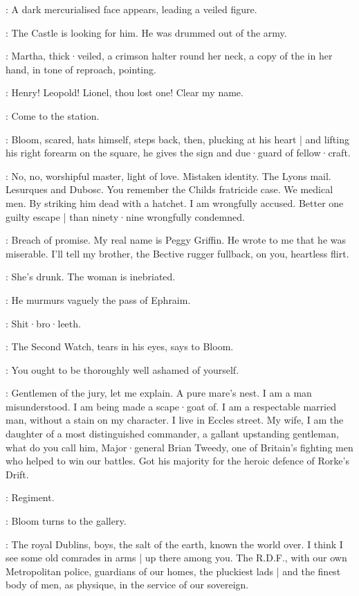 :
A dark mercurialised face appears,
leading a veiled figure.

\DarkMercury:
The Castle is looking for him.
He was drummed out of the army.

:
Martha,
thick·veiled,
a crimson halter round her neck,
a copy of the 
in her hand,
in tone of reproach,
pointing.

\Martha:
Henry!
Leopold!
Lionel,
thou lost one!
Clear my name.

\FirstWatch[1]:
Come to the station.

:
Bloom,
scared,
hats himself,
steps back,
then,
plucking at his heart |
and lifting his right forearm on the square,
he gives the sign and due·guard of fellow·craft.

\Bloom:
No,
no,
worshipful master,
light of love.
Mistaken identity.
The Lyons mail.
Lesurques and Dubosc.
You remember the Childs fratricide case.
We medical men.
By striking him dead with a hatchet.
I am wrongfully accused.
Better one guilty escape |
than ninety·nine wrongfully condemned.

\Martha:
Breach of promise.
My real name is Peggy Griffin.
He wrote to me that he was miserable.
I'll tell my brother,
the Bective rugger fullback,
on you,
heartless flirt.

\Bloom:
She's drunk.
The woman is inebriated.

:
He murmurs vaguely the pass of Ephraim.

\Bloom:
Shit·bro·leeth.

:
The Second Watch,
tears in his eyes,
says to Bloom.

\SecondWatch:
You ought to be thoroughly well ashamed of yourself.

\Bloom:
Gentlemen of the jury,
let me explain.
A pure mare's nest.
I am a man misunderstood.
I am being made a scape·goat of.
I am a respectable married man,
without a stain on my character.
I live in Eccles street.
My wife,
I am the daughter of a most distinguished commander,
a gallant upstanding gentleman,
what do you call him,
Major·general Brian Tweedy,
one of Britain's fighting men who helped to win our battles.
Got his majority for the heroic defence of Rorke's Drift.

\FirstWatch:
Regiment.

:
Bloom turns to the gallery.

\Bloom:
The royal Dublins,
boys,
the salt of the earth,
known the world over.
I think I see some old comrades in arms |
up there among you.
The R.D.F.,
with our own Metropolitan police,
guardians of our homes,
the pluckiest lads |
and the finest body of men,
as physique,
in the service of our sovereign.

